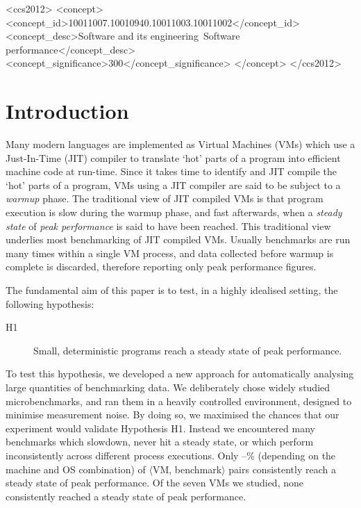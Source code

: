\documentclass[acmlarge]{acmart}\settopmatter{printfolios=true}
\newcommand{\hypone}{H1\xspace}
\newcommand{\vmbpair}{$\langle$VM, benchmark$\rangle$\xspace}
\begin{document}
\begin{CCSXML}
<ccs2012>
<concept>
<concept_id>10011007.10010940.10011003.10011002</concept_id>
<concept_desc>Software and its engineering~Software performance</concept_desc>
<concept_significance>300</concept_significance>
</concept>
</ccs2012>
\end{CCSXML}

\maketitle

\section{Introduction}
\label{sec:intro}

Many modern languages are implemented as Virtual Machines (VMs) which use a
Just-In-Time (JIT) compiler to translate `hot' parts of a program into efficient
machine code at run-time. Since it takes time to identify and JIT compile
the `hot' parts of a program, VMs using a JIT compiler are
said to be subject to a \emph{warmup} phase. The traditional view of
JIT compiled VMs is that program execution is slow during the warmup phase, and
fast afterwards, when a \emph{steady state} of \emph{peak performance} is said to have been reached.
This traditional view underlies most benchmarking of JIT compiled VMs.
Usually benchmarks are run many times within a single VM process, and
data collected before warmup is complete is discarded, therefore
reporting only peak performance figures.

The fundamental aim of this paper is to test, in a highly idealised setting, the following hypothesis:
\begin{description}
  \item[\hypone] Small, deterministic programs reach a steady state of peak performance.
\end{description}

To test this hypothesis, we developed a new approach for
automatically analysing large quantities of benchmarking data. We deliberately chose
widely studied microbenchmarks, and ran them in a heavily
controlled environment, designed to minimise measurement noise. By doing so, we
maximised the chances that our experiment would validate Hypothesis \hypone. Instead
we encountered many benchmarks which slowdown, never hit a steady
state, or which perform inconsistently across different process
executions. Only \mintwo--\maxtwo\% (depending on the machine and OS
combination) of \vmbpair pairs consistently reach a steady state of peak
performance. Of the seven VMs we studied, none consistently reached a steady
state of peak performance.
\end{document}
